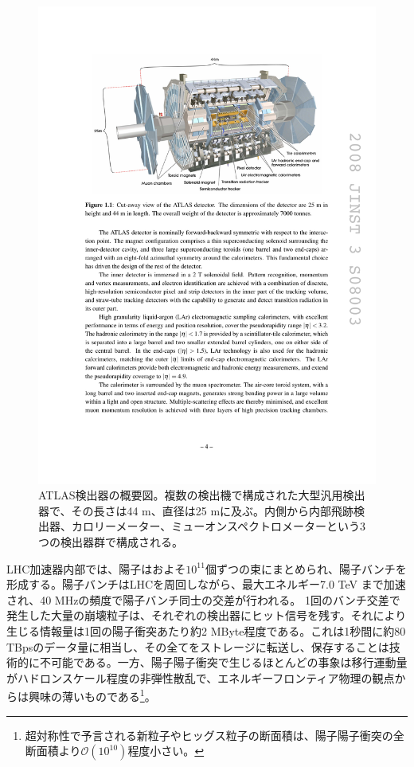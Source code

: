 \begin{figure} 
    \centering
    \includegraphics[width=16cm]{fig/Intro/ATLASdetector.pdf}
    \caption[ATLAS検出器の概要]{ATLAS検出器の概要図\cite{JINST:2008}。複数の検出機で構成された大型汎用検出器で、その長さは44 m、直径は25 mに及ぶ。内側から内部飛跡検出器、カロリーメーター、ミューオンスペクトロメーターという3つの検出器群で構成される。}
    \label{ATLASdetector}
\end{figure}

LHC加速器内部では、陽子はおよそ$10 ^ {11}$個ずつの束にまとめられ、陽子バンチを形成する。陽子バンチはLHCを周回しながら、最大エネルギー7.0 TeV まで加速され、40 MHzの頻度で陽子バンチ同士の交差が行われる。
1回のバンチ交差で発生した大量の崩壊粒子は、それぞれの検出器にヒット信号を残す。それにより生じる情報量は1回の陽子衝突あたり約2 MByte程度である。これは1秒間に約80 TBpsのデータ量に相当し、その全てをストレージに転送し、保存することは技術的に不可能である。一方、陽子陽子衝突で生じるほとんどの事象は移行運動量がハドロンスケール程度の非弾性散乱で、エネルギーフロンティア物理の観点からは興味の薄いものである\footnote{超対称性で予言される新粒子やヒッグス粒子の断面積は、陽子陽子衝突の全断面積より$\mathcal{O}(10^{10})$程度小さい。}。

